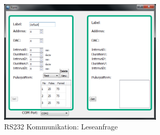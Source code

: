 \begin{figure}[H]
\begin{center}
\includegraphics[width=0.7\textwidth ]{img/general/PCClientBoard.PNG}
\caption{RS232 Kommunikation: Leseanfrage}
\label{figure_RS232Kommunikation}
\end{center}
\end{figure}
